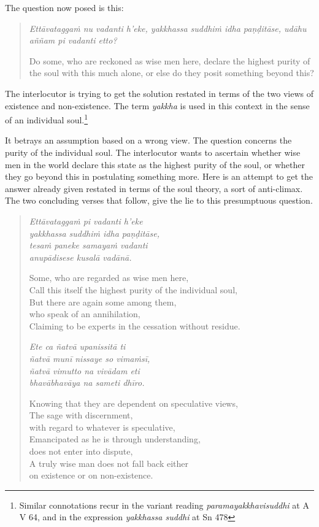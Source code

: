 The question now posed is this:

\begin{quote}
\emph{Ettāvataggaṁ nu vadanti h'eke, yakkhassa suddhiṁ idha paṇḍitāse, udāhu aññam pi vadanti etto?}

Do some, who are reckoned as wise men here, declare the highest purity of the soul with this much alone, or else do they posit something beyond this?
\end{quote}

The interlocutor is trying to get the solution restated in terms of the two views of existence and non-existence. The term \emph{yakkha} is used in this context in the sense of an individual soul.\footnote{Similar connotations recur in the variant reading \emph{paramayakkhavisuddhi} at A V 64, and in the expression \emph{yakkhassa suddhi} at Sn 478}

It betrays an assumption based on a wrong view. The question concerns the purity of the individual soul. The interlocutor wants to ascertain whether wise men in the world declare this state as the highest purity of the soul, or whether they go beyond this in postulating something more. Here is an attempt to get the answer already given restated in terms of the soul theory, a sort of anti-climax. The two concluding verses that follow, give the lie to this presumptuous question.

\begin{quote}
\emph{Ettāvataggaṁ pi vadanti h'eke}\\
\emph{yakkhassa suddhiṁ idha paṇḍitāse,}\\
\emph{tesaṁ paneke samayaṁ vadanti}\\
\emph{anupādisese kusalā vadānā.}

\clearpage

Some, who are regarded as wise men here,\\
Call this itself the highest purity of the individual soul,\\
But there are again some among them,\\
\vin who speak of an annihilation,\\
Claiming to be experts in the cessation without residue.

\emph{Ete ca ñatvā upanissitā ti}\\
\emph{ñatvā munī nissaye so vimaṁsī,}\\
\emph{ñatvā vimutto na vivādam eti}\\
\emph{bhavābhavāya na sameti dhīro.}

Knowing that they are dependent on speculative views,\\
The sage with discernment,\\
\vin with regard to whatever is speculative,\\
Emancipated as he is through understanding,\\
\vin does not enter into dispute,\\
A truly wise man does not fall back either\\
\vin on existence or on non-existence.
\end{quote}

